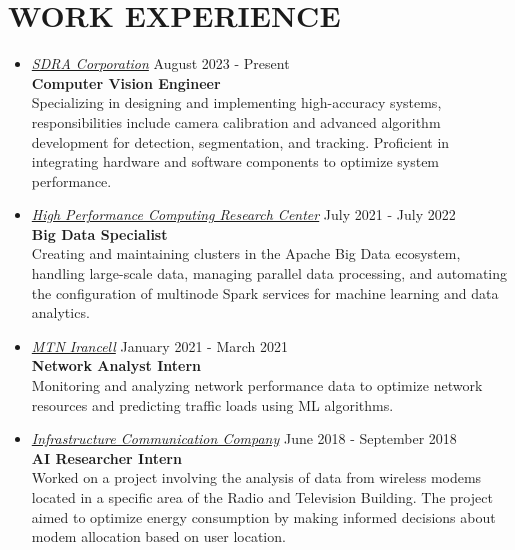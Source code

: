 \documentclass[11pt,a4paper,sans]{moderncv} %
\newcommand*{\authorimg}[1]{%
	\raisebox{-.3\baselineskip}{%
		\texttt{[image: \#1]}%
	}%
}
\begin{document}
\section{WORK EXPERIENCE}
\begin{itemize}
    \item \href{}{%
        \authorimg{Images/sdra_logo.jpg} \emph{SDRA Corporation}} \hfill August 2023 - Present \\
        \textbf{Computer Vision Engineer} \\
        Specializing in designing and implementing high-accuracy systems, responsibilities include camera calibration and advanced algorithm development for detection, segmentation, and tracking. Proficient in integrating hardware and software components to optimize system performance.

    \item \href{https://simorgh.cloud/}{%
        \authorimg{Images/simorgh_logo.jpeg} \emph{High Performance Computing Research Center}} \hfill July 2021 - July 2022 \\
        \textbf{Big Data Specialist} \\
        Creating and maintaining clusters in the Apache Big Data ecosystem, handling large-scale data, managing parallel data processing, and automating the configuration of multinode Spark services for machine learning and data analytics.

    \item \href{https://irancell.ir/en/home}{%
        \authorimg{Images/irancell_logo.png} \emph{MTN Irancell}} \hfill January 2021 - March 2021 \\
        \textbf{Network Analyst Intern} \\
        Monitoring and analyzing network performance data to optimize network resources and predicting traffic loads using ML algorithms.

    \item \href{https://www.tic.ir/en/home}{%
        \authorimg{Images/zirsakht_logo.png} \emph{Infrastructure Communication Company}} \hfill June 2018 - September 2018 \\
        \textbf{AI Researcher Intern} \\
        Worked on a project involving the analysis of data from wireless modems located in a specific area of the Radio and Television Building. The project aimed to optimize energy consumption by making informed decisions about modem allocation based on user location.
\end{itemize}
\end{document}
